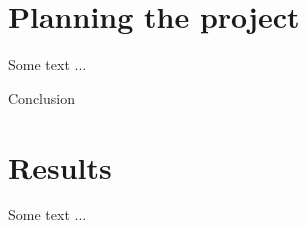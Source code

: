 \documentclass[UKenglish,thumbmarks]{uiophdthesis}   %
\begin{document}
\chapter{Planning the project}        %
Some text ...


\begin{uioseparatorpage}{Conclusion}  %
\end{uioseparatorpage}

\chapter{Results}                     %
Some text ...

\backmatter{}
\printbibliography{}
\end{document}
